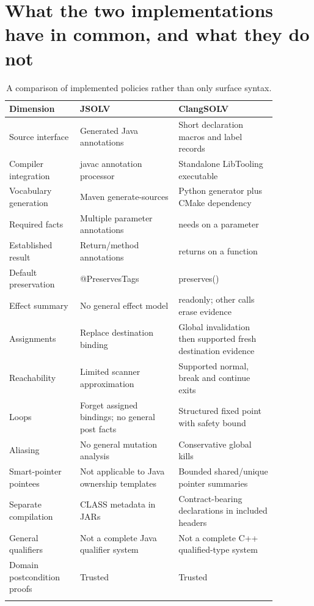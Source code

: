 \documentclass[11pt]{article}
\begin{document}
\section{What the two implementations have in common, and what they do not}
\begin{longtable}{>{\raggedright\arraybackslash}p{0.23\linewidth}>{\raggedright\arraybackslash}p{0.32\linewidth}>{\raggedright\arraybackslash}p{0.32\linewidth}}
\toprule
Dimension & JSOLV & ClangSOLV\\\midrule
\endhead
Source interface & Generated Java annotations & Short declaration macros and label records\\
Compiler integration & javac annotation processor & Standalone LibTooling executable\\
Vocabulary generation & Maven generate-sources & Python generator plus CMake dependency\\
Required facts & Multiple parameter annotations & needs on a parameter\\
Established result & Return/method annotations & returns on a function\\
Default preservation & @PreservesTags & preserves()\\
Effect summary & No general effect model & readonly; other calls erase evidence\\
Assignments & Replace destination binding & Global invalidation then supported fresh destination evidence\\
Reachability & Limited scanner approximation & Supported normal, break and continue exits\\
Loops & Forget assigned bindings; no general post facts & Structured fixed point with safety bound\\
Aliasing & No general mutation analysis & Conservative global kills\\
Smart-pointer pointees & Not applicable to Java ownership templates & Bounded shared/unique pointer summaries\\
Separate compilation & CLASS metadata in JARs & Contract-bearing declarations in included headers\\
General qualifiers & Not a complete Java qualifier system & Not a complete C++ qualified-type system\\
Domain postcondition proofs & Trusted & Trusted\\
\bottomrule
\caption{A comparison of implemented policies rather than only surface syntax.}
\end{longtable}
\end{document}
